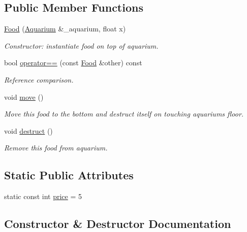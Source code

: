 \subsection*{Public Member Functions}
\begin{DoxyCompactItemize}
\item 
\mbox{\hyperlink{class_food_ad36b16582fc56aa938f50870f5ec6b52}{Food}} (\mbox{\hyperlink{class_aquarium}{Aquarium}} \&\+\_\+aquarium, float x)
\begin{DoxyCompactList}\small\item\em Constructor\+: instantiate food on top of aquarium. \end{DoxyCompactList}\item 
bool \mbox{\hyperlink{class_food_a7199d2bd48ecae8ffbbf1be8a39c5311}{operator==}} (const \mbox{\hyperlink{class_food}{Food}} \&other) const
\begin{DoxyCompactList}\small\item\em Reference comparison. \end{DoxyCompactList}\item 
void \mbox{\hyperlink{class_food_afb37f87b673df87697665ae82b6da0da}{move}} ()
\begin{DoxyCompactList}\small\item\em Move this food to the bottom and destruct itself on touching aquarium\textquotesingle{}s floor. \end{DoxyCompactList}\item 
void \mbox{\hyperlink{class_food_a5e1bfe34f8a4f4ce60accc57212c95c8}{destruct}} ()
\begin{DoxyCompactList}\small\item\em Remove this food from aquarium. \end{DoxyCompactList}\end{DoxyCompactItemize}
\subsection*{Static Public Attributes}
\begin{DoxyCompactItemize}
\item 
static const int \mbox{\hyperlink{class_food_af54f2090e84e95fcdc95f5c2d93386df}{price}} = 5
\end{DoxyCompactItemize}


\subsection{Constructor \& Destructor Documentation}
\mbox{\label{class_food_ad36b16582fc56aa938f50870f5ec6b52}} 
